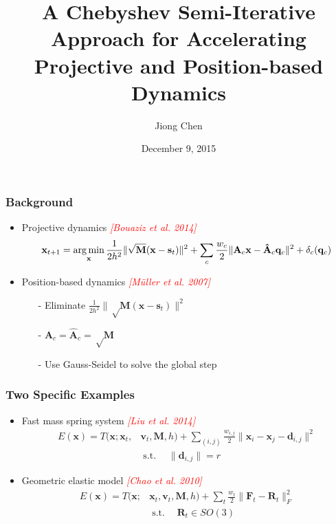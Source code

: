 \documentclass[serif,mathserif]{beamer}
\author[Jiong Chen]{Jiong Chen}
\title[\hspace{2em}\insertframenumber/\inserttotalframenumber]{\huge A Chebyshev Semi-Iterative Approach for Accelerating Projective and Position-based Dynamics}
\date{December 9, 2015} %
\newcommand{\BOLD}[1]{\mathbf{#1}}
\newcommand{\TODO}[1]{\textcolor{red}{#1}}
\newcommand{\argmin}{\operatornamewithlimits{arg\min}}
\DeclareMathOperator{\ST}{s.t.}
\begin{document}
\maketitle

\begin{frame}
 \frametitle{Background}
 \begin{itemize}
  \item Projective dynamics \TODO{\textit{[Bouaziz et al. 2014]}}
  \begin{equation*}
    \BOLD{x}_{t+1}=\argmin_{\BOLD{x}} \frac{1}{2h^2}\|\sqrt\BOLD{M}(\BOLD{x}-\BOLD{s}_t)\|^2+\sum_c\frac{w_c}{2}\|\BOLD{A}_c\BOLD{x}-\BOLD{\hat A}_c\BOLD{q}_c\|^2+\delta_c(\BOLD{q}_c)
  \end{equation*}
  \item Position-based dynamics \TODO{\textit{[M\"uller et al. 2007]}}
    \begin{itemize}
     \item[-] Eliminate $\frac{1}{2h^2}\|\sqrt\BOLD{M}(\BOLD{x}-\BOLD{s}_t)\|^2$
     \item[-] $\BOLD{A}_c = \BOLD{\hat A}_c = \sqrt \BOLD{M}$
     \item[-] Use Gauss-Seidel to solve the global step
    \end{itemize}
 \end{itemize}
\end{frame}

\begin{frame}
 \frametitle{Two Specific Examples}
 \begin{itemize}
  \item Fast mass spring system \TODO{\textit{[Liu et al. 2014]}}
  \begin{equation*}
   \begin{split}
    E(\BOLD{x})=T(\BOLD{x}; \BOLD{x}_t, &\BOLD{v}_t, \BOLD{M}, h)+ \sum_{(i, j)}\frac{w_{i, j}}{2}\|\BOLD{x}_i-\BOLD{x}_j-\BOLD{d}_{i,j}\|^2 \\
    &\ST \quad \|\BOLD{d}_{i,j}\| = r
   \end{split}
  \end{equation*}
  \item Geometric elastic model \TODO{\textit{[Chao et al. 2010]}}
  \begin{equation*}
   \begin{split}
    E(\BOLD{x})=T(\BOLD{x}; &\BOLD{x}_t, \BOLD{v}_t, \BOLD{M}, h)+ \sum_{t}\frac{w_t}{2}\|\BOLD{F}_t-\BOLD{R}_t\|_F^2 \\
    &\ST \quad \BOLD{R}_t \in SO(3)
   \end{split}
  \end{equation*}
 \end{itemize}
\end{frame}
\end{document}

